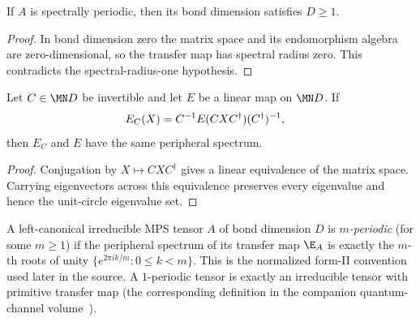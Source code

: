 \begin{lemma}
    \label{thm:spectral_periodic_bond_dimension_pos}
    \leanok
    If $A$ is spectrally periodic, then its bond dimension satisfies $D\geq1$.
\end{lemma}
\begin{proof}
    \leanok
    In bond dimension zero the matrix space and its endomorphism algebra are
    zero-dimensional, so the transfer map has spectral radius zero.  This
    contradicts the spectral-radius-one hypothesis.
\end{proof}

\begin{lemma}
    \label{lem:peripheral_spectrum_similarity}
    \leanok
    Let $C\in\MN D$ be invertible and let $E$ be a linear map on $\MN D$.  If
    \begin{align}
        E_C(X) & =C^{-1}E(CXC^\dagger)(C^\dagger)^{-1},
        \notag
    \end{align}
    then $E_C$ and $E$ have the same peripheral spectrum.
\end{lemma}
\begin{proof}\leanok
    Conjugation by $X\mapsto CXC^\dagger$ gives a linear equivalence of the
    matrix space.  Carrying eigenvectors across this equivalence preserves
    every eigenvalue and hence the unit-circle eigenvalue set.
\end{proof}

\begin{definition}
    \label{def:periodic_tensor}
    \leanok
    A left-canonical irreducible MPS tensor $A$ of bond dimension $D$ is
    \emph{$m$-periodic} (for some $m\ge1$) if the peripheral spectrum of
    its transfer map $\E_A$ is exactly the $m$-th roots of unity
    $\{e^{2\pi i k/m}:0\le k<m\}$. This is the normalized form-II
    convention used later in the source.
    A $1$-periodic tensor is exactly an irreducible tensor with
    primitive transfer map (the corresponding definition in the companion quantum-channel volume~\cite[``Primitive map'']{QICLean2026Blueprint}).
\end{definition}

